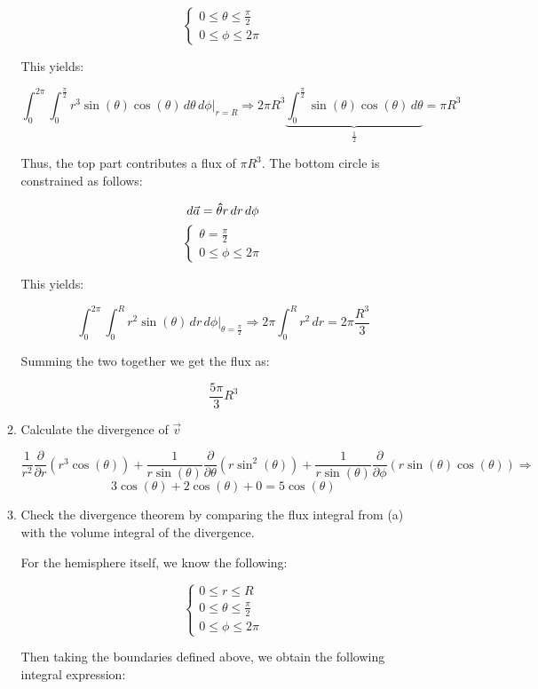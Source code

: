 \begin{enumerate}
\begin{enumerate}
        $$\left\{\begin{array}{l} 0\leq\theta\leq\frac{\pi}{2}\\0\leq\phi\leq2\pi\end{array}$$

          This yields:

          $$\int_0^{2\pi}\int_0^{\frac{\pi}{2}} r^3\sin(\theta)\cos(\theta)\,d\theta\,d\phi\Big|_{r=R}\Rightarrow2\pi R^3\underbrace{\int_0^{\frac{\pi}{2}} \sin(\theta)\cos(\theta)\,d\theta}_{\frac{1}{2}}=\pi R^3$$

          Thus, the top part contributes a flux of $\pi R^3$. The bottom circle is constrained as follows:

          $$d\vec{a}=\bold{\hat{\theta}}r\,dr\,d\phi$$
          $$\left\{\begin{array}{l} \theta = \frac{\pi}{2}\\ 0\leq \phi\leq 2\pi\end{array}$$

            This yields:

            $$\int_0^{2\pi}\int_0^R r^2\sin(\theta)\,dr\,d\phi\Big|_{\theta=\frac{\pi}{2}}\Rightarrow 2\pi\int_0^Rr^2\,dr=2\pi \frac{R^3}{3}$$

            Summing the two together we get the flux as:

            $$\boxed{\frac{5\pi}{3}R^3}$$

      \item Calculate the divergence of $\vec{v}$

        $$\frac{1}{r^2}\frac{\partial}{\partial r}(r^3\cos(\theta))+\frac{1}{r\sin(\theta)}\frac{\partial}{\partial \theta}(r\sin^2(\theta))+\frac{1}{r\sin(\theta)}\frac{\partial}{\partial \phi}(r\sin(\theta)\cos(\theta))\Rightarrow$$
        $$3\cos(\theta)+2\cos(\theta)+0=\boxed{5\cos(\theta)}$$

      \item Check the divergence theorem by comparing the flux integral from (a) with the volume integral of the divergence.

        For the hemisphere itself, we know the following:

        $$\left\{\begin{array}{l} 0\leq r\leq R\\0\leq\theta\leq \frac{\pi}{2}\\0\leq\phi\leq 2\pi\end{array}$$

        Then taking the boundaries defined above, we obtain the following integral expression:


\end{enumerate}
\end{enumerate}
